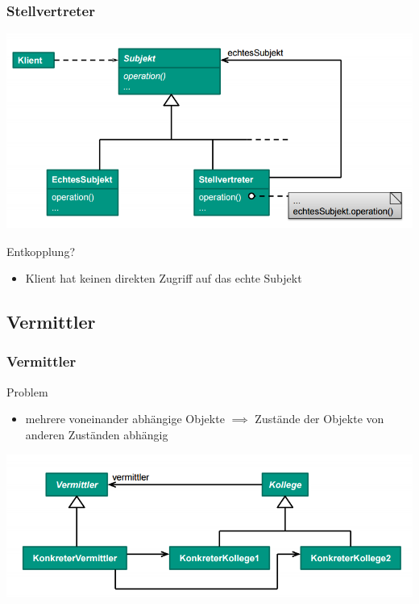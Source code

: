 \documentclass[18pt]{beamer}
\begin{document}
	\begin{frame}
		\frametitle{Stellvertreter}
		\centering
		\includegraphics[scale=0.4]{./pics/tut3/prox.png}
		\begin{block}{Entkopplung?}
			\begin{itemize}
				\pause 
				\item Klient hat keinen direkten Zugriff auf das echte Subjekt
			\end{itemize}
		\end{block}
	\end{frame}


	\subsection{Vermittler}
		\begin{frame}
		\frametitle{Vermittler}
		\begin{block}{Problem}
			\begin{itemize}
				\item mehrere voneinander abhängige Objekte \linebreak \pause $\implies$ Zustände der Objekte von anderen Zuständen abhängig
			\end{itemize}
		\end{block}
		\pause
		\centering
		\includegraphics[scale=0.45]{./pics/tut3/med.png}
	\end{frame}
\end{document}
